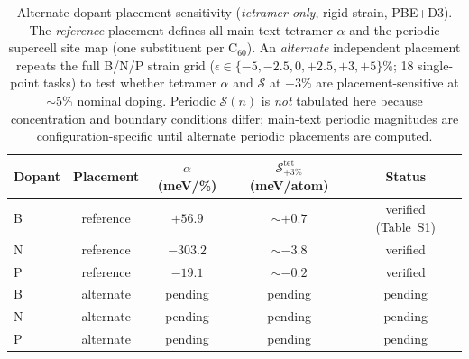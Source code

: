 \begin{table}[t]
\caption{\label{tab:S4}Alternate dopant-placement sensitivity (\emph{tetramer only}, rigid strain, PBE+D3).
The \emph{reference} placement defines all main-text tetramer $\alpha$ and the periodic supercell site map (one substituent per C$_{60}$).
An \emph{alternate} independent placement repeats the full B/N/P strain grid ($\epsilon\in\{-5,-2.5,0,+2.5,+3,+5\}$\%; 18 single-point tasks) to test whether tetramer $\alpha$ and $\mathcal{S}$ at $+3$\% are placement-sensitive at ${\sim}5$\% nominal doping.
Periodic $\mathcal{S}(n)$ is \emph{not} tabulated here because concentration and boundary conditions differ; main-text periodic magnitudes are configuration-specific until alternate periodic placements are computed.}
\begin{ruledtabular}
\begin{tabular}{lcccc}
Dopant & Placement & $\alpha$ (meV/\%) & $\mathcal{S}_{+3\%}^{\mathrm{tet}}$ (meV/atom) & Status \\
\hline
B & reference & $+56.9$ & ${\sim}{+}0.7$ & verified (Table~S1) \\
N & reference & $-303.2$ & ${\sim}{-}3.8$ & verified \\
P & reference & $-19.1$ & ${\sim}{-}0.2$ & verified \\
B & alternate & pending & pending & pending \\
N & alternate & pending & pending & pending \\
P & alternate & pending & pending & pending \\
\end{tabular}
\end{ruledtabular}
\end{table}

